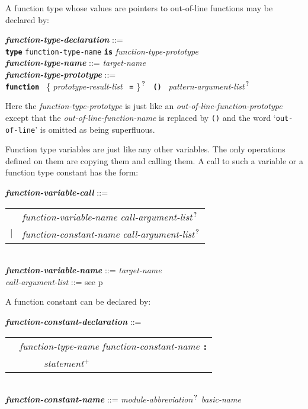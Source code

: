 \documentclass[12pt]{article}
\newcommand{\TT}[1]{{\tt \bfseries #1}}
\newcommand{\PLUS}[1][]{{$^{+#1}$}}
\newcommand{\QMARK}{{$^{\,\mbox{\footnotesize ?}}$}}
\newcommand{\ttkey}[1]{{\tt \bfseries #1}}
\newcommand{\emkey}[1]{{\em \bfseries #1}}
\newcommand{\pagref}[1]{p\pageref{#1}}
\newenvironment{indpar}[1][0.3in]%
	{\begin{list}{}%
		     {\setlength{\itemsep}{0in}%
		      \setlength{\topsep}{0in}%
		      \setlength{\parsep}{1ex}%
		      \setlength{\labelwidth}{#1}%
		      \setlength{\leftmargin}{#1}%
		      \addtolength{\leftmargin}{\labelsep}}%
	 \item}%
	{\end{list}}
\begin{document}
A function type whose values are pointers to out-of-line
functions may be declared by:

\begin{indpar}
\emkey{function-type-declaration}\label{FUNCTION-TYPE-DECLARATION} ::= \\
\hspace*{0.5in}
    \ttkey{type} {\tt function-type-name} \TT{is}
                 {\em function-type-prototype}
\\[0.5ex]
\emkey{function-type-name} ::= {\em target-name}
\\[0.5ex]
\emkey{function-type-prototype}%
	\label{FUNCTION-TYPE-PROTOTYPE} ::= \\
\hspace*{0.25in} \ttkey{function}~
        \{ {\em prototype-result-list}~ \TT{=} \}\QMARK{}~
	\TT{()}~ {\em pattern-argument-list}\QMARK{}
\end{indpar}

Here the {\em function-type-prototype} is just like an
{\em out-of-line-function-prototype} except that the
{\em out-of-line-function-name} is replaced by {\tt ()} and
the word `{\tt out-of-line}' is omitted as being superfluous.

Function type variables are just like any other variables.
The only operations defined on them are copying them and
calling them.  A call to such a variable or a function type
constant has the form:
\begin{indpar}
\emkey{function-variable-call}\label{FUNCTION-VARIABLE-CALL} ::= \\
\hspace*{0.25in}\begin{tabular}{rl}
	& {\em function-variable-name}
	     {\em call-argument-list}\QMARK{} \\
    $|$ & {\em function-constant-name}
	     {\em call-argument-list}\QMARK{}
    \end{tabular}
\\[0.5ex]
\emkey{function-variable-name} ::= {\em target-name}
\\[0.5ex]
{\em call-argument-list} ::= see \pagref{CALL-ARGUMENT-LIST}
\end{indpar}

A function constant can be declared by:
\begin{indpar}
\emkey{function-constant-declaration}%
    \label{FUNCTION-CONSTANT-DECLARATION} ::= \\
\hspace*{0.5in}
    \begin{tabular}[t]{rl}
        &  {\em function-type-name} {\em function-constant-name} \TT{:} \\
	& \TT{~~~~~}{\em statement}\PLUS{} \\
    \end{tabular} \\
\emkey{function-constant-name} ::=
    {\em module-abbreviation}\QMARK{} {\em basic-name}
\end{indpar}
\end{document}
